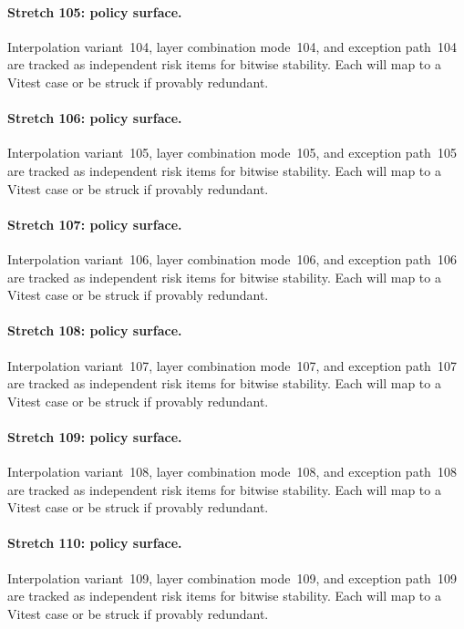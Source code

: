 \documentclass[sigconf,nonacm]{acmart}
\begin{document}
\paragraph{Stretch 105: policy surface.}
Interpolation variant~104, layer combination mode~104, and exception path~104 are tracked as independent risk items for bitwise stability. Each will map to a Vitest case or be struck if provably redundant. %

\paragraph{Stretch 106: policy surface.}
Interpolation variant~105, layer combination mode~105, and exception path~105 are tracked as independent risk items for bitwise stability. Each will map to a Vitest case or be struck if provably redundant. %

\paragraph{Stretch 107: policy surface.}
Interpolation variant~106, layer combination mode~106, and exception path~106 are tracked as independent risk items for bitwise stability. Each will map to a Vitest case or be struck if provably redundant. %

\paragraph{Stretch 108: policy surface.}
Interpolation variant~107, layer combination mode~107, and exception path~107 are tracked as independent risk items for bitwise stability. Each will map to a Vitest case or be struck if provably redundant. %

\paragraph{Stretch 109: policy surface.}
Interpolation variant~108, layer combination mode~108, and exception path~108 are tracked as independent risk items for bitwise stability. Each will map to a Vitest case or be struck if provably redundant. %

\paragraph{Stretch 110: policy surface.}
Interpolation variant~109, layer combination mode~109, and exception path~109 are tracked as independent risk items for bitwise stability. Each will map to a Vitest case or be struck if provably redundant. %
\end{document}
